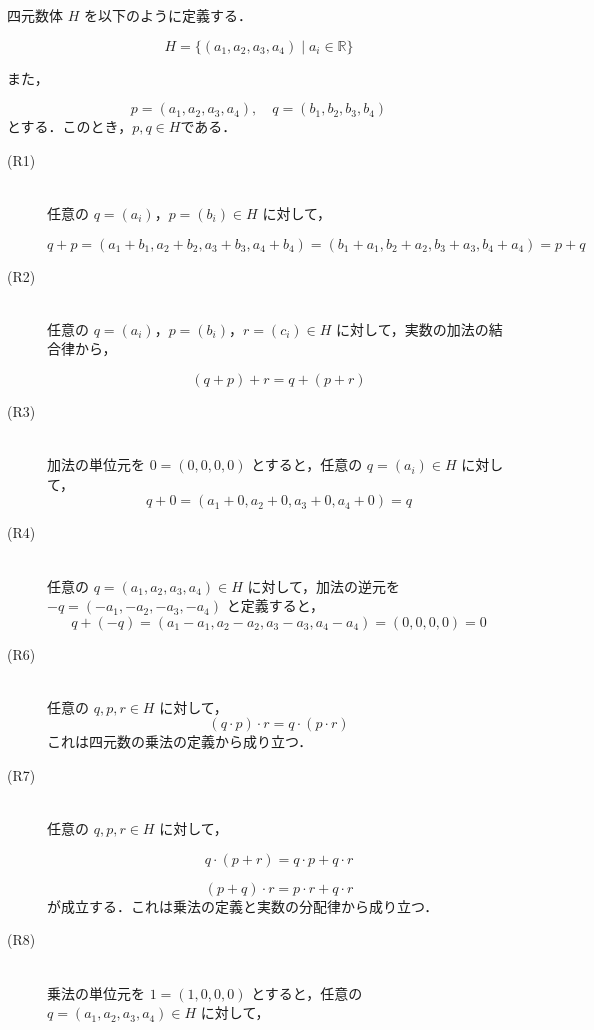 \begin{tproof}
    四元数体 $H$ を以下のように定義する．

    \[
        H = \{ (a_1, a_2, a_3, a_4) \mid a_i \in \mathbb{R}\}
    \]

    また，

    \[
        p=(a_1, a_2, a_3, a_4),\quad q=(b_1, b_2, b_3, b_4)
    \]
    とする．このとき，$ p ,q \in H$である．
    \begin{description}
        \item [(R1)] \mbox{} \\
              任意の $q = (a_i)$，$p = (b_i) \in H$ に対して，

              \[
                  q + p = (a_1 + b_1, a_2 + b_2, a_3 + b_3, a_4 + b_4) = (b_1 + a_1, b_2 + a_2, b_3 + a_3, b_4 + a_4) = p + q
              \]
        \item [(R2)] \mbox{} \\
              任意の $q = (a_i)$，$p = (b_i)$，$r = (c_i) \in H$ に対して，実数の加法の結合律から，

              \[
                  (q + p) + r = q + (p + r)
              \]
        \item [(R3)] \mbox{} \\
              加法の単位元を $0 = (0, 0, 0, 0)$ とすると，任意の $q = (a_i) \in H$ に対して，
              \[
                  q + 0 = (a_1 + 0, a_2 + 0, a_3 + 0, a_4 + 0) = q
              \]

        \item [(R4)] \mbox{} \\
              任意の $q = (a_1, a_2, a_3, a_4) \in H$ に対して，加法の逆元を $-q = (-a_1, -a_2, -a_3, -a_4)$ と定義すると，
              \[
                  q + (-q) = (a_1 - a_1, a_2 - a_2, a_3 - a_3, a_4 - a_4) = (0, 0, 0, 0) = 0
              \]
        \item [(R6)] \mbox{} \\
              任意の $q, p, r \in H$ に対して，
              \[
                  (q \cdot p) \cdot r = q \cdot (p \cdot r)
              \]
              これは四元数の乗法の定義から成り立つ．
        \item[(R7)] \mbox{} \\
              任意の $q, p, r \in H$ に対して，

              \[
                  q \cdot (p + r) = q \cdot p + q \cdot r
              \]

              \[
                  (p + q) \cdot r = p \cdot r + q \cdot r
              \]
              が成立する．これは乗法の定義と実数の分配律から成り立つ．
        \item [(R8)] \mbox{} \\
              乗法の単位元を $1 = (1, 0, 0, 0)$ とすると，任意の $q = (a_1, a_2, a_3, a_4) \in H$ に対して，


\end{description}
\end{tproof}
